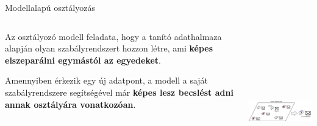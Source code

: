 \documentclass[english, aspectratio=169]{beamer}
\begin{document}
\begin{frame}{Modellalapú osztályozás}
\begin{columns}
\begin{column}{.5\textwidth}
Az osztályozó modell feladata, hogy a tanító adathalmaza alapján olyan szabályrendszert hozzon létre, ami \textbf{képes elszeparálni egymástól az egyedeket}.\par\medskip
Amennyiben érkezik egy új adatpont, a modell a saját szabályrendszere segítségével már \textbf{képes lesz becslést adni annak osztályára vonatkozóan}. 
\end{column}
\begin{column}{.5\textwidth}
\begin{center}
\includegraphics[width=7cm, height=7cm, keepaspectratio]{images/osztalyozas_5.png}
\end{center}
\end{column}
\end{columns}
\end{frame}
\end{document}
